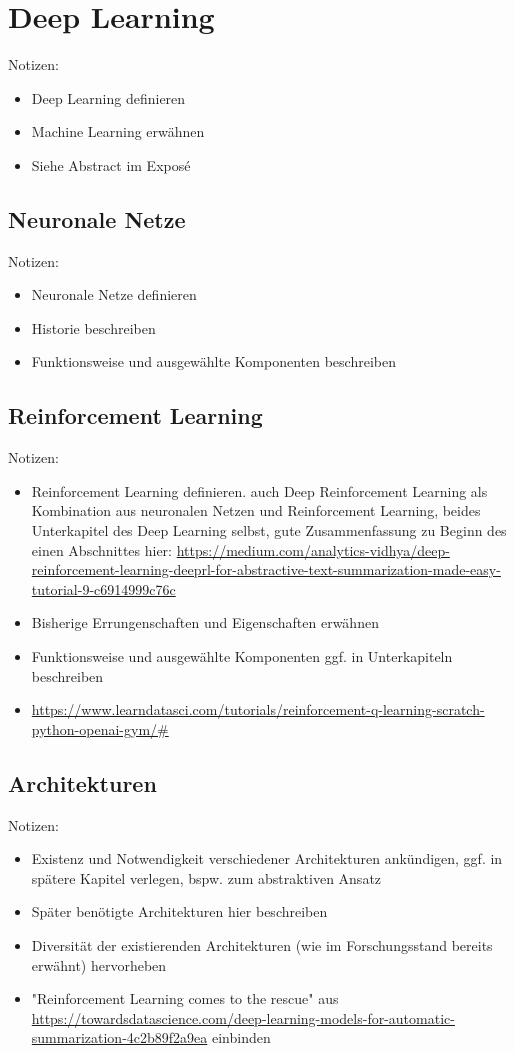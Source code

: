 \chapter{Deep Learning}
\thispagestyle{fancy}
\label{chap:Deep Learning}

Notizen:
\begin{itemize}
	\item Deep Learning definieren
	\item Machine Learning erwähnen
	\item Siehe Abstract im Exposé
\end{itemize}


\section{Neuronale Netze}
Notizen:
\begin{itemize}
	\item Neuronale Netze definieren
	\item Historie beschreiben
	\item Funktionsweise und ausgewählte Komponenten beschreiben
\end{itemize}


\section{Reinforcement Learning}
Notizen:
\begin{itemize}
	\item Reinforcement Learning definieren. auch Deep Reinforcement Learning als Kombination aus neuronalen Netzen und Reinforcement Learning, beides Unterkapitel des Deep Learning selbst, gute Zusammenfassung zu Beginn des einen Abschnittes hier: \url{https://medium.com/analytics-vidhya/deep-reinforcement-learning-deeprl-for-abstractive-text-summarization-made-easy-tutorial-9-c6914999c76c}
	\item Bisherige Errungenschaften und Eigenschaften erwähnen
	\item Funktionsweise und ausgewählte Komponenten ggf. in Unterkapiteln beschreiben
	\item \url{https://www.learndatasci.com/tutorials/reinforcement-q-learning-scratch-python-openai-gym/#}
\end{itemize}


\section{Architekturen}
Notizen:
\begin{itemize}
	\item Existenz und Notwendigkeit verschiedener Architekturen ankündigen, ggf. in spätere Kapitel verlegen, bspw. zum abstraktiven Ansatz
	\item Später benötigte Architekturen hier beschreiben
	\item Diversität der existierenden Architekturen (wie im Forschungsstand bereits erwähnt) hervorheben
	\item "Reinforcement Learning comes to the rescue" aus \url{https://towardsdatascience.com/deep-learning-models-for-automatic-summarization-4c2b89f2a9ea} einbinden
\end{itemize}


